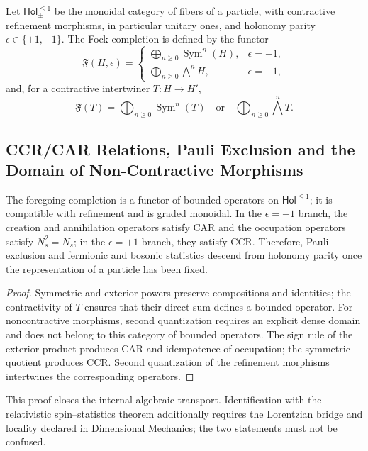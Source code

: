 Let \(\mathsf{Hol}_{\pm}^{\leq1}\) be the monoidal category of fibers of a
particle, with contractive refinement morphisms, in particular unitary ones,
and holonomy parity
\(\epsilon\in\{+1,-1\}\). The Fock completion is defined by the functor
\[
 \mathfrak F(H,\epsilon)=
 \begin{cases}
 \displaystyle\bigoplus_{n\ge0}\operatorname{Sym}^n(H),
     &\epsilon=+1,\\[2mm]
 \displaystyle\bigoplus_{n\ge0}\bigwedge^n\!H,
     &\epsilon=-1,
 \end{cases}
\]
and, for a contractive intertwiner \(T:H\to H'\),
\[
 \mathfrak F(T)=
 \bigoplus_{n\ge0}\operatorname{Sym}^n(T)
 \quad\text{or}\quad
 \bigoplus_{n\ge0}\bigwedge^n\!T.
\]

\subsection{CCR/CAR Relations, Pauli Exclusion and the Domain of Non-Contractive Morphisms}

\begin{theorem}
The foregoing completion is a functor of bounded operators on \(\mathsf{Hol}_{\pm}^{\leq1}\); it is compatible with refinement and is graded monoidal. In the \(\epsilon=-1\) branch, the creation and annihilation operators satisfy CAR and the occupation operators satisfy \(N_s^2=N_s\); in the \(\epsilon=+1\) branch, they satisfy CCR. Therefore, Pauli exclusion and fermionic and bosonic statistics descend from holonomy parity once the representation of a particle has been fixed.
\end{theorem}

\begin{proof}
Symmetric and exterior powers preserve compositions and identities; the contractivity of \(T\) ensures that their direct sum defines a bounded operator. For noncontractive morphisms, second quantization requires an explicit dense domain and does not belong to this category of bounded operators. The sign rule of the exterior product produces CAR and idempotence of occupation; the symmetric quotient produces CCR. Second quantization of the refinement morphisms intertwines the corresponding operators.
\end{proof}

This proof closes the internal algebraic transport. Identification
with the relativistic spin--statistics theorem additionally requires the
Lorentzian bridge and locality declared in Dimensional Mechanics; the two statements
must not be confused.

